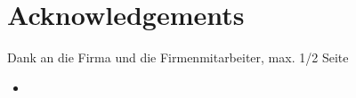 \chapter*{Acknowledgements} %

Dank an die Firma und die Firmenmitarbeiter, max. 1/2 Seite

\begin{itemize}
  \item {}
\end{itemize}

\newpage

